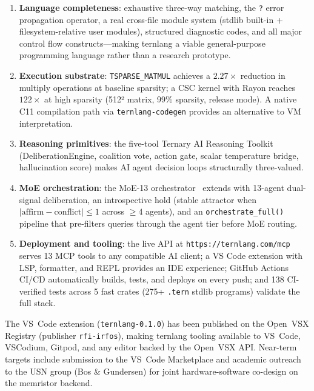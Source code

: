 \documentclass[journal,10pt,twocolumn]{IEEEtran}
\begin{document}
\begin{enumerate}
  \item \textbf{Language completeness}: exhaustive three-way matching, the
        \texttt{?} error propagation operator, a real cross-file module system
        (stdlib built-in + filesystem-relative user modules), structured
        diagnostic codes, and all major control flow constructs—making ternlang
        a viable general-purpose programming language rather than a research
        prototype.

  \item \textbf{Execution substrate}: \texttt{TSPARSE\_MATMUL} achieves a
        $2.27\times$ reduction in multiply operations at baseline sparsity;
        a CSC kernel with Rayon reaches $122\times$ at high sparsity (512²
        matrix, 99\% sparsity, release mode). A native C11 compilation path
        via \texttt{ternlang-codegen} provides an alternative to VM
        interpretation.

  \item \textbf{Reasoning primitives}: the five-tool Ternary AI Reasoning
        Toolkit (DeliberationEngine, coalition vote, action gate, scalar
        temperature bridge, hallucination score) makes AI agent decision loops
        structurally three-valued.

  \item \textbf{MoE orchestration}: the MoE-13 orchestrator~\cite{moe13_2026}
        extends with 13-agent dual-signal deliberation, an introspective hold
        (stable attractor when $|\text{affirm} - \text{conflict}| \leq 1$
        across $\geq 4$ agents), and an \texttt{orchestrate\_full()} pipeline
        that pre-filters queries through the agent tier before MoE routing.

  \item \textbf{Deployment and tooling}: the live API at
        \texttt{https://ternlang.com/mcp} serves 13 MCP tools to any compatible
        AI client; a VS Code extension with LSP, formatter, and REPL provides
        an IDE experience; GitHub Actions CI/CD automatically builds, tests, and
        deploys on every push; and 138 CI-verified tests across 5 fast crates
        (275+ \texttt{.tern} stdlib programs) validate the full stack.
\end{enumerate}

The VS~Code extension (\texttt{ternlang-0.1.0}) has been published on the
Open~VSX Registry (publisher \texttt{rfi-irfos}), making ternlang tooling
available to VS~Code, VSCodium, Gitpod, and any editor backed by the Open~VSX
API. Near-term targets include submission to the VS~Code Marketplace and academic
outreach to the USN group (Bos \& Gundersen) for joint hardware-software
co-design on the memristor backend.
\end{document}
